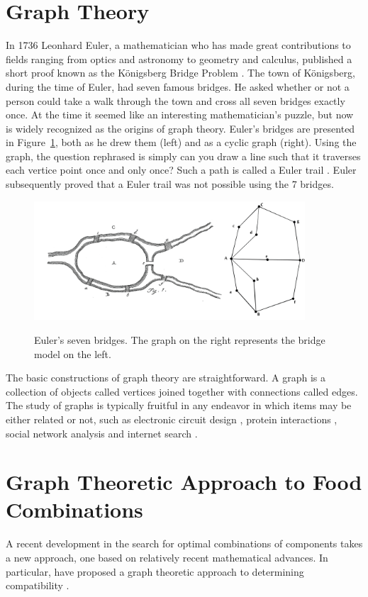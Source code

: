 \section{Graph Theory}
In 1736 Leonhard Euler, a mathematician who has made great contributions to fields ranging from optics and astronomy to geometry and calculus, published a short proof known as the K\"{o}nigsberg Bridge Problem \citep{Euler1736}. The town of K\"{o}nigsberg, during the time of Euler, had seven famous bridges.  He asked whether or not a person could take a walk through the town and cross all seven bridges exactly once.  At the time it seemed like an interesting mathematician’s puzzle, but now is widely recognized as the origins of graph theory. Euler’s bridges are presented in Figure~\ref{fig:eulerbridges}, both as he drew them (left) and as a cyclic graph (right).  Using the graph, the question rephrased is simply can you draw a line such that it traverses each vertice point once and only once?  Such a path is called a Euler trail \citep{Bollobaas1998}.  Euler subsequently proved that a Euler trail was not possible using the 7 bridges.

\begin{figure}[h!]
\caption[Euler's seven bridges.]{Euler's seven bridges.  The graph on the right represents the bridge model on the left.}
\centering
\includegraphics[width=0.9\textwidth]{./img/euler.png}
\label{fig:eulerbridges}
\end{figure}


The basic constructions of graph theory are straightforward.  A graph is a collection of objects called vertices \citep{Bollobaas1998} joined together with connections called edges.  The study of graphs is typically fruitful in any endeavor in which items may be either related or not, such as electronic circuit design \citep{Bollobaas1998},  protein interactions \citep{Palla2005}, social network analysis \citep{Knoke2008} and internet search \citep{Brin1998}.  

\section{Graph Theoretic Approach to Food Combinations}
A recent development in the search for optimal combinations of components takes a new approach, one based on relatively recent mathematical advances.  In particular, \citet{Ennisa} have proposed a graph theoretic approach to determining compatibility \citep[see also][]{Ennis2010, Ennis2011}.

